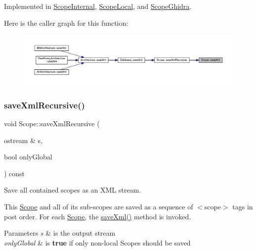 Implemented in \mbox{\hyperlink{class_scope_internal_af73cb738b4a29cf9aa076ce382ff110f}{Scope\+Internal}}, \mbox{\hyperlink{class_scope_local_a5ce828992aceb086c5bcc62d8cf2f3ae}{Scope\+Local}}, and \mbox{\hyperlink{class_scope_ghidra_abb73fa9a07b114dfa8994423f2aae170}{Scope\+Ghidra}}.

Here is the caller graph for this function\+:
\nopagebreak
\begin{figure}[H]
\begin{center}
\leavevmode
\includegraphics[width=350pt]{class_scope_a2583da1be37d68197dfbb0445fa1f3e0_icgraph}
\end{center}
\end{figure}
\mbox{\label{class_scope_a68c1f312cf9173871baa1b2fad29bb58}} 
\subsubsection{\texorpdfstring{saveXmlRecursive()}{saveXmlRecursive()}}
{\footnotesize\ttfamily void Scope\+::save\+Xml\+Recursive (\begin{DoxyParamCaption}\item[{ostream \&}]{s,  }\item[{bool}]{only\+Global }\end{DoxyParamCaption}) const}



Save all contained scopes as an X\+ML stream. 

This \mbox{\hyperlink{class_scope}{Scope}} and all of its sub-\/scopes are saved as a sequence of $<$scope$>$ tags in post order. For each \mbox{\hyperlink{class_scope}{Scope}}, the \mbox{\hyperlink{class_scope_a2583da1be37d68197dfbb0445fa1f3e0}{save\+Xml()}} method is invoked. 
\begin{DoxyParams}{Parameters}
{\em s} & is the output stream \\
\hline
{\em only\+Global} & is {\bfseries{true}} if only non-\/local Scopes should be saved \\
\hline
\end{DoxyParams}



